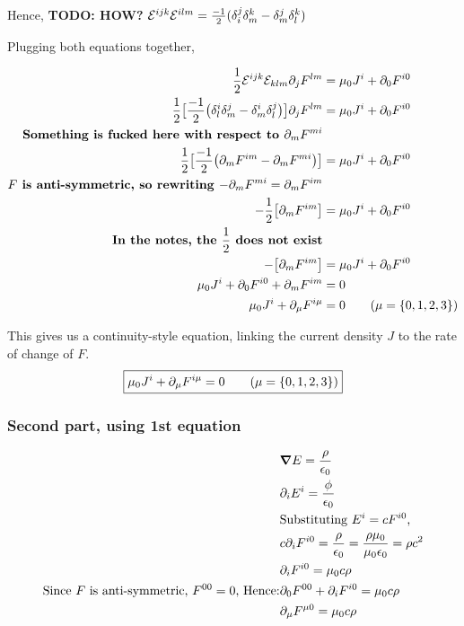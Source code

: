 Hence, \textbf{TODO: HOW?}
$\mathcal{E}^{ijk} \mathcal{E}^{ilm} = \frac{-1}{2} (\delta^j_i \delta^k_m - \delta^j_m \delta^k_l)$


Plugging both equations together,

\begin{align*}
    \frac{1}{2} \levicevita^{ijk} \levicevita_{klm} \partial_j F^{lm} &=  \mu_0 J^i + \partial_0 F^{i0}  \\
    \frac{1}{2} \big[ 
   \frac{-1}{2} \big(\delta^i_l \delta^j_m - \delta^i_m \delta^j_l\big) \big]
   \partial_j F^{lm} &=  \mu_0 J^i + \partial_0 F^{i0} \\
    \textbf{Something is fucked here with respect to $\partial_m F^{mi}$} \\
    \frac{1}{2} \big[ \frac{-1}{2} \big(
    \partial_m F^{im} - \partial_m F^{mi} \big) \big] &= \mu_0 J^i + \partial_0 F^{i0}   \\
        \textbf{$F$ is anti-symmetric, so rewriting $-\partial_m F^{mi} = \partial_m F^{im}$} \\
    -\frac{1}{2} \big[ \partial_m F^{im} \big] &= \mu_0 J^i + \partial_0 F^{i0}   \\
       \textbf{In the notes, the $\frac{1}{2}$ does not exist} \\
    - \big[ \partial_m F^{im} \big] &= \mu_0 J^i + \partial_0 F^{i0}   \\
    \mu_0 J^i + \partial_0 F^{i0}  + \partial_m F^{im}  &= 0 \\
    \mu_0 J^i + \partial_\mu F^{i\mu} &= 0 \tag{$\mu = \{0, 1, 2, 3 \}$}
\end{align*}

This gives us a continuity-style equation, linking the current density $J$ to
the rate of change of $F$.
\begin{equation}
    \boxed{ \mu_0 J^i + \partial_\mu F^{i\mu} = 0 \tag{$\mu = \{0, 1, 2, 3 \}$} }
\end{equation}


\subsubsection{Second part, using 1st equation}

\begin{align*}
    &\grad E = \frac{\rho}{\epsilon_0} \\
    &\partial_i E^i = \frac{\phi}{\epsilon_0} \\
    &\text{Substituting $E^i = c F^{i0}$, } \\
    &c \partial_i F^{i0} = \frac{\rho}{\epsilon_0}  = \frac{\rho \mu_0}{\mu_0 \epsilon_0} = \rho c^2 \\
    &\partial_i F^{i0} = \mu_0 c \rho \\
    \text{Since $F$ is anti-symmetric, $F^{00} = 0$, Hence:}
    &\partial_0 F^{00} + \partial_i F^{i0} = \mu_0 c \rho \\
    &\partial_\mu F^{\mu 0} = \mu_0 c \rho
\end{align*}

